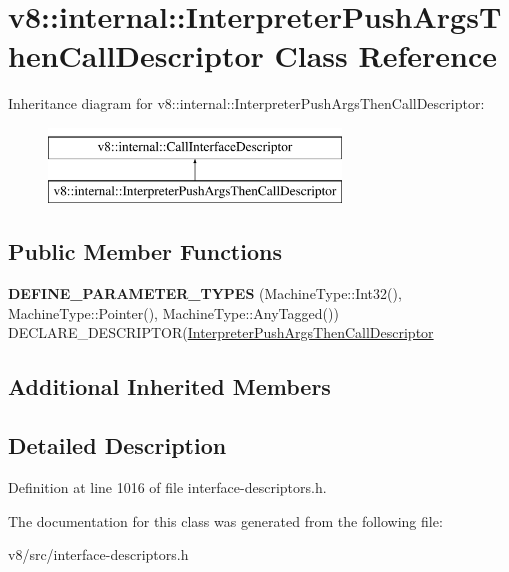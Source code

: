 \hypertarget{classv8_1_1internal_1_1InterpreterPushArgsThenCallDescriptor}{}\section{v8\+:\+:internal\+:\+:Interpreter\+Push\+Args\+Then\+Call\+Descriptor Class Reference}
\label{classv8_1_1internal_1_1InterpreterPushArgsThenCallDescriptor}
Inheritance diagram for v8\+:\+:internal\+:\+:Interpreter\+Push\+Args\+Then\+Call\+Descriptor\+:\begin{figure}[H]
\begin{center}
\leavevmode
\includegraphics[height=2.000000cm]{classv8_1_1internal_1_1InterpreterPushArgsThenCallDescriptor}
\end{center}
\end{figure}
\subsection*{Public Member Functions}
\begin{DoxyCompactItemize}
\item 
\mbox{\label{classv8_1_1internal_1_1InterpreterPushArgsThenCallDescriptor_aaa66dcc3f2f3b8d3541906484fe20359}} 
{\bfseries D\+E\+F\+I\+N\+E\+\_\+\+P\+A\+R\+A\+M\+E\+T\+E\+R\+\_\+\+T\+Y\+P\+ES} (Machine\+Type\+::\+Int32(), Machine\+Type\+::\+Pointer(), Machine\+Type\+::\+Any\+Tagged()) D\+E\+C\+L\+A\+R\+E\+\_\+\+D\+E\+S\+C\+R\+I\+P\+T\+OR(\mbox{\hyperlink{classv8_1_1internal_1_1InterpreterPushArgsThenCallDescriptor}{Interpreter\+Push\+Args\+Then\+Call\+Descriptor}}
\end{DoxyCompactItemize}
\subsection*{Additional Inherited Members}


\subsection{Detailed Description}


Definition at line 1016 of file interface-\/descriptors.\+h.



The documentation for this class was generated from the following file\+:\begin{DoxyCompactItemize}
\item 
v8/src/interface-\/descriptors.\+h\end{DoxyCompactItemize}
